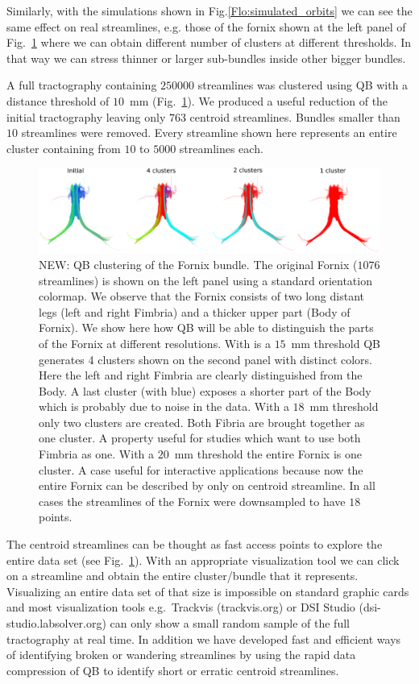 \documentclass{bioinfo}
\begin{document}
Similarly, with the simulations shown in Fig.\ref{Flo:simulated_orbits}
we can see the same effect on real streamlines, e.g. those of the fornix
shown at the left panel of Fig.~\ref{Flo:QB_fornix} where we can obtain
different number of clusters at different thresholds. In that way we can
stress thinner or larger sub-bundles inside other bigger bundles.

A full tractography containing $\num{250000}$ streamlines was clustered
using QB with a distance threshold of $10$~mm
(Fig.~\ref{Flo:QB_fornix}).  We produced a useful reduction of the
initial tractography leaving only $763$ centroid streamlines. Bundles
smaller than $10$ streamlines were removed. Every streamline shown here
represents an entire cluster containing from $10$ to $\num{5000}$
streamlines each.

\begin{figure}[htp]
\centerline{\includegraphics[width=160mm]{Figures/Fig_6_QB_fornix}}
\caption{NEW: QB clustering of the Fornix bundle. The original Fornix
  ($1076$ streamlines) is shown on the left panel using a standard
  orientation colormap. We observe that the Fornix consists of two long
  distant legs (left and right Fimbria) and a thicker upper part (Body
  of Fornix). We show here how QB will be able to distinguish the parts
  of the Fornix at different resolutions. With is a $15$~mm threshold QB
  generates 4 clusters shown on the second panel with distinct
  colors. Here the left and right Fimbria are clearly distinguished from
  the Body. A last cluster (with blue) exposes a shorter part of the
  Body which is probably due to noise in the data. With a $18$~mm
  threshold only two clusters are created. Both Fibria are brought
  together as one cluster. A property useful for studies which want to
  use both Fimbria as one. With a $20$~mm threshold the entire Fornix is
  one cluster. A case useful for interactive applications because now
  the entire Fornix can be described by only on centroid streamline. In
  all cases the streamlines of the Fornix were downsampled to have $18$
  points.\label{Flo:QB_fornix}}
\end{figure}

The centroid streamlines can be thought as fast access points to explore
the entire data set (see Fig.~\ref{Flo:QB_fornix}). With an appropriate
visualization tool we can click on a streamline and obtain the entire
cluster/bundle that it represents. Visualizing an entire data set of
that size is impossible on standard graphic cards and most visualization
tools e.g.~Trackvis (trackvis.org) or DSI Studio
(dsi-studio.labsolver.org) can only show a small random sample of the
full tractography at real time. In addition we have developed fast and
efficient ways of identifying broken or wandering streamlines by using
the rapid data compression of QB to identify short or erratic centroid
streamlines.
\end{document}

